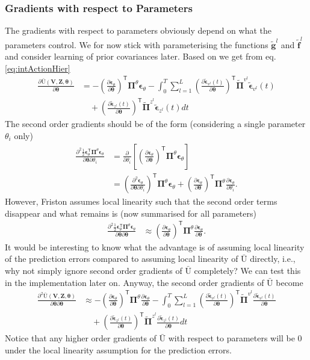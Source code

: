\documentclass[a4paper,10pt]{article}
\newcommand{\bs}[1]{\mathbf{#1}}					%
\newcommand{\bgs}[1]{\boldsymbol{#1}}				%
\newcommand{\pd}[2]{\frac{\partial #1}{\partial #2}} 	%
\newcommand{\ppd}[3]{\frac{\partial^2 #1}{\partial #2 \partial #3}} %
\newcommand{\tr}{\mathsf{T}}				%
\newcommand{\gc}[1]{\tilde{#1}} %
\renewcommand{\ss}{z}         %
\newcommand{\sv}{v}         %
\newcommand{\spe}{\epsilon} %
\renewcommand{\sp}{\theta}    %
\newcommand{\ppe}{\bgs{\spe}} %
\newcommand{\ppeg}{\gc{\ppe}} %
\newcommand{\pp}{\bgs{\sp}} %
\newcommand{\Ps}{\bs{Z}}    %
\newcommand{\Pv}{\bs{V}}    %
\newcommand{\Ua}{\bar{\mathrm{U}}}		%
\newcommand{\Prec}{\bgs{\Pi}}			%
\begin{document}
\subsubsection{Gradients with respect to Parameters}
The gradients with respect to parameters obviously depend on what the parameters control. We for now stick with parameterising the functions $\gc{\bs{g}}^l$ and $\gc{\bs{f}}^l$ and consider learning of prior covariances later. Based on \citep[][eq. (85)]{Petersen2008} we get from eq. \eqref{eq:intActionHier}
\begin{align}
    \pd{\Ua(\Pv,\Ps,\pp)}{\pp} &= -\left(\pd{\ppe_\sp}{\pp}\right)^\tr\Prec^{\sp}\ppe_\sp - \int_0^T \sum_{l=1}^L \left(\pd{\ppeg_{\sv^l}(t)}{\pp}\right)^\tr\gc{\Prec}^{\sv^l}\ppeg_{\sv^l}(t)\nonumber\\
    &\quad + \left(\pd{\ppeg_{\ss^l}(t)}{\pp}\right)^\tr\gc{\Prec}^{\ss^l}\ppeg_{\ss^l}(t)  dt
\end{align}
The second order gradients should be of the form (considering a single parameter $\sp_i$ only)
\begin{align}
    \ppd{\frac{1}{2}\ppe_\sp^\tr\Prec^{\sp}\ppe_\sp}{\pp}{\sp_i} &= \pd{}{\sp_i}\left[\left(\pd{\ppe_\sp}{\pp}\right)^\tr\Prec^{\sp}\ppe_\sp\right]\nonumber\\
    &= \left(\ppd{\ppe_\sp}{\pp}{\sp_i}\right)^\tr\Prec^{\sp}\ppe_\sp + \left(\pd{\ppe_\sp}{\pp}\right)^\tr\Prec^{\sp}\pd{\ppe_\sp}{\sp_i}.
\end{align}
However, Friston assumes local linearity such that the second order terms disappear and what remains is (now summarised for all parameters)
\begin{align}
    \ppd{\frac{1}{2}\ppe_\sp^\tr\Prec^{\sp}\ppe_\sp}{\pp}{\pp} &\approx \left(\pd{\ppe_\sp}{\pp}\right)^\tr\Prec^{\sp}\pd{\ppe_\sp}{\pp}.
\end{align}
It would be interesting to know what the advantage is of assuming local linearity of the prediction errors compared to assuming local linearity of $\Ua$ directly, i.e., why not simply ignore second order gradients of $\Ua$ completely? We can test this in the implementation later on. Anyway, the second order gradients of $\Ua$ become
\begin{align}
    \ppd{\Ua(\Pv,\Ps,\pp)}{\pp}{\pp} &\approx -\left(\pd{\ppe_\sp}{\pp}\right)^\tr\Prec^{\sp}\pd{\ppe_\sp}{\pp} - \int_0^T \sum_{l=1}^L \left(\pd{\ppeg_{\sv^l}(t)}{\pp}\right)^\tr\gc{\Prec}^{\sv^l}\pd{\ppeg_{\sv^l}(t)}{\pp}\nonumber\\
    &\quad + \left(\pd{\ppeg_{\ss^l}(t)}{\pp}\right)^\tr\gc{\Prec}^{\ss^l}\pd{\ppeg_{\ss^l}(t)}{\pp}  dt
\end{align}
Notice that any higher order gradients of $\Ua$ with respect to parameters will be 0 under the local linearity assumption for the prediction errors. 
\end{document}
